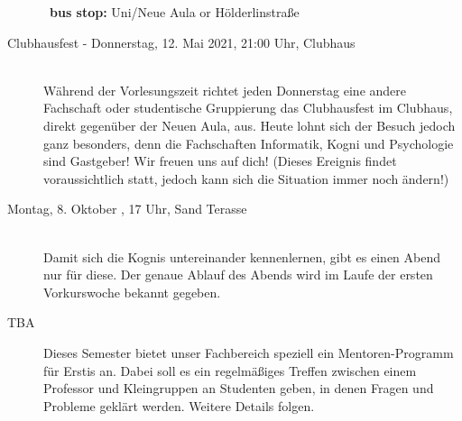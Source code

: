 \begin{description}
        ~\textbf{bus stop:} Uni/Neue Aula or Hölderlinstraße
\else
    \item[Clubhausfest - Donnerstag, 12. Mai 2021, 21:00 Uhr, Clubhaus]\ \\
        Während der Vorlesungszeit richtet jeden Donnerstag eine andere Fachschaft oder studentische Gruppierung das Clubhausfest im Clubhaus, direkt gegenüber der Neuen Aula, aus. Heute lohnt sich der Besuch jedoch ganz besonders, denn die Fachschaften Informatik, Kogni und Psychologie sind Gastgeber! Wir freuen uns auf dich! (Dieses Ereignis findet voraussichtlich statt, jedoch kann sich die Situation immer noch ändern!)

\fi

\ifkogwiss

    \item[Montag, 8. Oktober \YEAR, 17 Uhr, Sand Terasse ]\ \\
    Damit sich die Kognis untereinander kennenlernen, gibt es einen Abend nur für diese. Der genaue Ablauf des Abends wird im Laufe der ersten Vorkurswoche bekannt gegeben.
\fi

\ifbachelor
	\item[TBA] Dieses Semester bietet unser Fachbereich speziell ein Mentoren-Programm für Erstis an. Dabei soll es ein regelmäßiges Treffen zwischen einem Professor und Kleingruppen an Studenten geben, in denen Fragen und Probleme geklärt werden. Weitere Details folgen.
\fi

\end{description}
